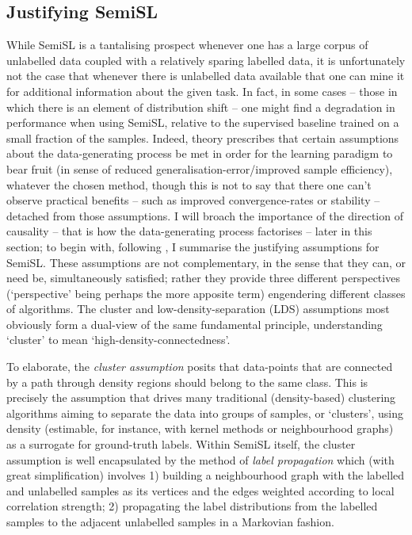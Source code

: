 \subsection{Justifying \acl{SemiSL}}\label{ssec:assumptions}
While \ac{SemiSL} is a tantalising prospect whenever one has a large corpus of unlabelled data
coupled with a relatively sparing labelled data, it is unfortunately not the case that whenever
there is unlabelled data available that one can mine it for additional information about the given
task. 
%
In fact, in some cases -- those in which there is an element of distribution shift -- one might
find a degradation in performance when using \ac{SemiSL}, relative to the supervised baseline trained on
a small fraction of the samples.
%
Indeed, theory prescribes that certain assumptions about the data-generating process be met in
order for the learning paradigm to bear fruit (in sense of reduced generalisation-error/improved
sample efficiency), whatever the chosen method, though this is not to say that there one can't
observe practical benefits -- such as improved convergence-rates or stability -- detached from
those assumptions.
%
I will broach the importance of the direction of causality -- that is how the data-generating
process factorises -- later in this section; to begin with, following \citep{chapelle2009semi}, I
summarise the justifying assumptions for \ac{SemiSL}.
%
These assumptions are not complementary, in the sense that they can, or need be, simultaneously
satisfied; rather they provide three different perspectives (`perspective' being perhaps the more
apposite term) engendering different classes of algorithms. 
%
The cluster and low-density-separation (LDS) assumptions most obviously form a dual-view of the same
fundamental principle, understanding `cluster' to mean `high-density-connectedness'.
%

%
To elaborate, the \emph{cluster assumption} posits that data-points that are connected by a path
through density regions should belong to the same class.
%
%
This is precisely the assumption that drives many traditional (density-based) clustering algorithms
aiming to separate the data into groups of samples, or `clusters', using density (estimable, for
instance, with kernel methods or neighbourhood graphs) as a surrogate for ground-truth labels.
%
Within \ac{SemiSL} itself, the cluster assumption is well encapsulated by the method of \emph{label
propagation} \citep{szummer2001partially} which (with great simplification) involves 1) building a
neighbourhood graph with the labelled and unlabelled samples as its vertices and the edges weighted
according to local correlation strength; 2) propagating the label distributions from the labelled
samples to the adjacent unlabelled samples in a Markovian fashion.
%

